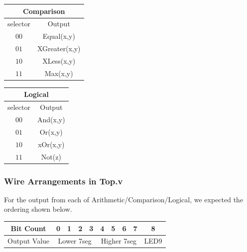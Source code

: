 \documentclass[11pt]{article}
\begin{document}
\begin{center}
    \begin{minipage}[t]{0.4\textwidth}
        \begin{center}
            \begin{tabular}{|c|c|}
                \hline
                \multicolumn{2}{|c|}{Comparison} \\
                \hline
                selector & Output \\
                \hline
                $00$ & Equal(x,y) \\
                $01$ & XGreater(x,y) \\
                $10$ & XLess(x,y) \\
                $11$ & Max(x,y) \\
                \hline
            \end{tabular}
        \end{center}
    \end{minipage}
    \begin{minipage}[t]{0.4\textwidth}
        \begin{center}
            \begin{tabular}{|c|c|}
                \hline
                \multicolumn{2}{|c|}{Logical} \\
                \hline
                selector & Output \\
                \hline
                $00$ & And(x,y) \\
                $01$ & Or(x,y) \\
                $10$ & xOr(x,y) \\
                $11$ & Not(z) \\
                \hline
            \end{tabular}
        \end{center}
    \end{minipage}
\end{center}

\subsubsection{Wire Arrangements in Top.v}

For the output from each of Arithmetic/Comparison/Logical, we expected the ordering shown below.
\begin{center}
    \begin{tabular}{|c|c|c|c|c|c|c|c|c|c|}
        \hline
        Bit Count & 0 & 1 & 2 & 3 & 4 & 5 & 6 & 7 & 8 \\
        \hline
        Output Value & \multicolumn{4}{|c|}{Lower 7seg} & \multicolumn{4}{|c|}{Higher 7seg} & LED9 \\
        \hline
    \end{tabular}
\end{center}
\end{document}
